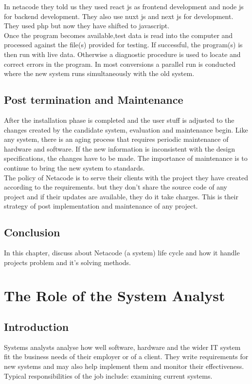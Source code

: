 \documentclass[a4paper,12pt]{report}
\begin{document}
In netacode they told us they used  react js as frontend development and node js for backend development. They also use nuxt js and next js for development. They used php but now they have shifted to javascript. \\

Once the program becomes available,test data is read into the computer and  processed against the file(s) provided for testing. If successful, the program(s) is then run with live data. Otherwise  a diagnostic procedure is used to locate and correct errors in the program. In most conversions a parallel run is conducted where the new system runs simultaneously with the old system. 
\section{Post termination and Maintenance }
After the installation phase is completed and the user stuff is adjusted to the changes created by the candidate system, evaluation and  maintenance begin. Like any system, there is an aging process that requires periodic maintenance of hardware and software. If the new information is inconsistent with the design specifications, the changes have to be made. The importance of maintenance is to continue to bring the new system to standards.\\ 

The policy of Netacode is to serve their clients with the project they have created according to the requirements. but they don't share the source code of any project and if their updates are available, they do it take charges. This is their strategy of post implementation and maintenance of any project.
\section{Conclusion}
In this chapter, discuss about Netacode (a system) life cycle and how it handle projects problem and it's solving methods.







\chapter{The Role of the System Analyst}
\section{Introduction}
Systems analysts analyse how well software, hardware and the wider IT system fit the business needs of their employer or of a client. They write requirements for new systems and may also help implement them and monitor their effectiveness. Typical responsibilities of the job include: examining current systems.
\end{document}
